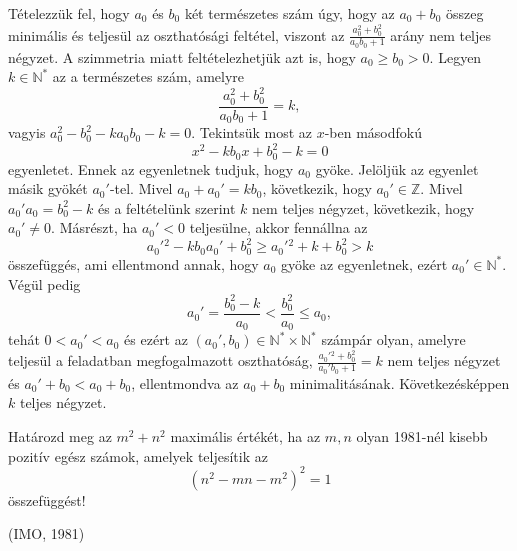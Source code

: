 \begin{solution}
Tételezzük fel, hogy $a_{0}$ és $b_{0}$ két természetes szám úgy,
hogy az $a_{0}+b_{0}$ összeg minimális és teljesül az oszthatósági
feltétel, viszont az $\frac{a_{0}^{2}+b_{0}^{2}}{a_{0}b_{0}+1}$ arány
nem teljes négyzet. A szimmetria miatt feltételezhetjük azt is, hogy
$a_{0}\ge b_{0}>0.$ Legyen $k\in\mathbb{N}^{*}$ az a természetes
szám, amelyre 
\[
\frac{a_{0}^{2}+b_{0}^{2}}{a_{0}b_{0}+1}=k,
\]
vagyis $a_{0}^{2}-b_{0}^{2}-ka_{0}b_{0}-k=0$. Tekintsük most az $x$-ben
másodfokú 
\[
x^{2}-kb_{0}x+b_{0}^{2}-k=0
\]
egyenletet. Ennek az egyenletnek tudjuk, hogy $a_{0}$ gyöke. Jelöljük
az egyenlet másik gyökét $a_{0}'$-tel. Mivel $a_{0}+a_{0}'=kb_{0}$,
következik, hogy $a_{0}'\in\mathbb{Z}$. Mivel $a_{0}'a_{0}=b_{0}^{2}-k$
és a feltételünk szerint $k$ nem teljes négyzet, következik, hogy
$a_{0}'\ne0.$ Másrészt, ha $a_{0}'<0$ teljesülne, akkor fennállna
az 
\[
a_{0}'{}^{2}-kb_{0}a_{0}'+b_{0}^{2}\ge a_{0}'{}^{2}+k+b_{0}^{2}>k
\]
összefüggés, ami ellentmond annak, hogy $a_{0}$ gyöke az egyenletnek,
ezért $a_{0}'\in\mathbb{N}^{*}.$ Végül pedig 
\[
a_{0}'=\frac{b_{0}^{2}-k}{a_{0}}<\frac{b_{0}^{2}}{a_{0}}\le a_{0},
\]
tehát $0<a_{0}'<a_{0}$ és ezért az $(a_{0}',b_{0})\in\mathbb{N}^{*}\times\mathbb{N}^{*}$
számpár olyan, amelyre teljesül a feladatban megfogalmazott oszthatóság,
$\frac{a_{0}'{}^{2}+b_{0}^{2}}{a_{0}'b_{0}+1}=k$ nem teljes négyzet
és $a_{0}'+b_{0}<a_{0}+b_{0}$, ellentmondva az $a_{0}+b_{0}$ minimalitásának.
Következésképpen $k$ teljes négyzet. 
\end{solution}

\begin{extraproblem}
\label{fel:fib1} %
 Határozd meg az $m^{2}+n^{2}$ maximális értékét, ha az $m,n$ olyan
1981-nél kisebb pozitív egész számok, amelyek teljesítik az 
\begin{equation}
(n^{2}-mn-m^{2})^{2}=1\label{eq:ta1}
\end{equation}
összefüggést! 
\begin{flushright}
(IMO, 1981) 
\par\end{flushright}
\end{extraproblem}

